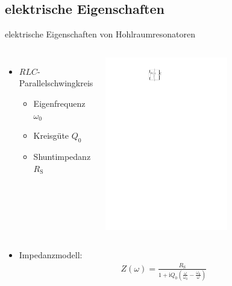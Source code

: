 \documentclass[12pt,xcolor=dvipsnames,professionalfonts]{beamer}
\begin{document}
\subsection{elektrische Eigenschaften}
\begin{frame}{elektrische Eigenschaften von Hohlraumresonatoren}
	\begin{columns}[c]
		\begin{itemize}
			\item $RLC$-Parallelschwingkreis
			\begin{itemize}
				\item Eigenfrequenz $\omega_0$
				\item Kreisgüte $Q_0$
				\item Shuntimpedanz $R_\mathrm{S}$
			\end{itemize}
		\end{itemize}
		
		\centering
		\includegraphics[width=0.6\textwidth]{./figures/RLC_circuit.pdf}
	\end{columns}
	
	\begin{itemize}
		\item Impedanzmodell:
		\begin{align*}
			Z(\omega) = \frac{R_\mathrm{S}}{1 + \mathrm{i} Q_0 \left( \frac{\omega}{\omega_0} - \frac{\omega_0}{\omega} \right)}
		\end{align*}
	\end{itemize}
\end{frame}
\end{document}
